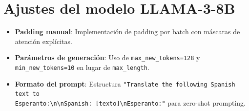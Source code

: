 \documentclass[11pt,spanish,listoffigures,listoftables]{tfgetsinf}
\begin{document}
\section{Ajustes del modelo LLAMA-3-8B}
\label{sec:ajustes_llama3}

\begin{itemize}
  \item \textbf{Padding manual}: Implementación de padding por batch con máscaras de atención explícitas.
  \item \textbf{Parámetros de generación}: Uso de \texttt{max\_new\_tokens=128} y \texttt{min\_new\_tokens=10} en lugar de \texttt{max\_length}.
  \item \textbf{Formato del prompt}: Estructura \texttt{"Translate the following Spanish text to \\Esperanto:\textbackslash n\textbackslash nSpanish: [texto]\textbackslash nEsperanto:"} para zero-shot prompting.
\end{itemize}

\end{document}
